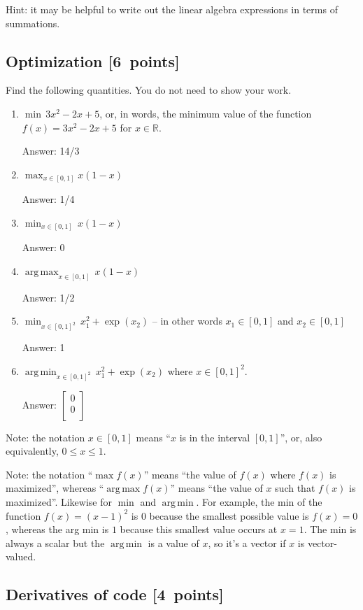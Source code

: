 \documentclass{article}
\newcommand{\blu}[1]{{\textcolor{blu}{#1}}}
\newcommand{\gre}[1]{\textcolor{gre}{#1}}
\newcommand\ans[1]{\par\gre{Answer: #1}}
\newenvironment{answer}{\par\begingroup\color{gre}Answer: }{\endgroup}
\let\ask\blu
\newcommand\pts[1]{\textcolor{pointscolour}{[#1~points]}}
\def\R{\mathbb{R}}
\DeclareMathOperator*{\argmax}{arg\,max}
\DeclareMathOperator*{\argmin}{arg\,min}
\begin{document}
  Hint: it may be helpful to write out the linear algebra expressions in terms of summations.


  \subsection{Optimization \pts{6}}

  \ask{Find the following quantities.} You do not need to show your work.
  

  \begin{enumerate}
  \item $\min \, 3x^2-2x+5$, or, in words, the minimum value of the function $f(x) = 3x^2 -2x + 5$ for $x \in \R$.
  \ans{14/3}
  \item $\max_{x \in [0, 1]} x(1-x)$
  \ans{1/4}
  \item $\min_{x \in [0, 1]} \, x(1-x)$
  \ans{0}
  \item $\argmax_{x \in [0,1]} \, x(1-x)$
  \ans{1/2}
  \item $\min_{x \in [0, 1]^2} \, x_1^2 + \exp(x_2)$ -- in other words $x_1\in [0,1]$ and $x_2\in [0,1]$
  \ans{1}
  \item $\argmin_{x \in [0,1]^2} \, x_1^2 + \exp(x_2)$ where $x \in [0,1]^2$.
    \begin{answer}
        $\left[\begin{array}{c}
        0\\
        0\\
        \end{array}\right]$
   \end{answer}
  \end{enumerate}

  Note: the notation $x\in [0,1]$ means ``$x$ is in the interval $[0,1]$'', or, also equivalently, $0 \leq x \leq 1$.

  Note: the notation ``$\max f(x)$'' means ``the value of $f(x)$ where $f(x)$ is maximized'', whereas ``$\argmax  f(x)$'' means ``the value of $x$ such that $f(x)$ is maximized''.
  Likewise for $\min$ and $\argmin$. For example, the min of the function $f(x)=(x-1)^2$ is $0$ because the smallest possible value is $f(x)=0$,
  whereas the arg min is $1$ because this smallest value occurs at $x=1$. The min is always a scalar but the $\argmin$ is a value of $x$, so it's a vector
  if $x$ is vector-valued.

  \subsection{Derivatives of code \pts{4}}
\end{document}
